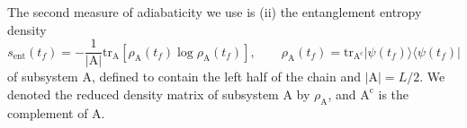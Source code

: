 \documentclass{SciPost}
\newcommand\0{\scalebox{-1}[1]{0}}
\begin{document}
The second measure of adiabaticity we use is (ii) the entanglement entropy density
\begin{equation}
s_\mathrm{ent}(t_f) = -\frac{1}{|\mathrm{A}|}\mathrm{tr}_{\mathrm{A}}\left[\rho_\mathrm{A}(t_f)\log\rho_\mathrm{A}(t_f)\right], \qquad \rho_\mathrm{A}(t_f) = \mathrm{tr}_{\mathrm{A^c}} |\psi(t_f)\rangle\langle\psi(t_f)|
\end{equation}
of subsystem A, defined to contain the left half of the chain and $|\mathrm{A}|=L/2$. We denoted the reduced density matrix of subsystem A by $\rho_\mathrm{A}$, and $\mathrm{A^c}$ is the complement of A.

\end{document}
